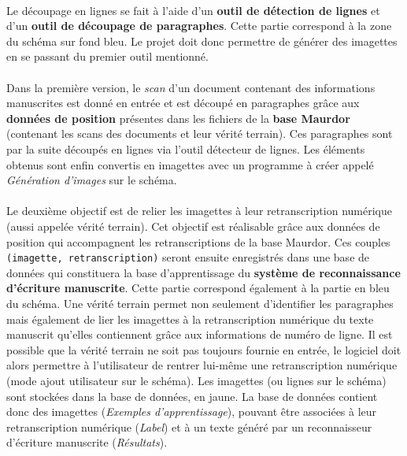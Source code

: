 \paragraph{}
Le découpage en lignes se fait à l’aide d’un \textbf{outil de détection de lignes} et d’un
\textbf{outil de découpage de paragraphes}. Cette partie correspond à la zone du schéma sur fond bleu.
Le projet doit donc permettre de générer des imagettes en se passant du premier outil mentionné.

\paragraph{}
Dans la première version, le \textit{scan} d’un document contenant des informations manuscrites est
donné en entrée et est découpé en paragraphes grâce aux \textbf{données de position} présentes dans
les fichiers de la \textbf{base Maurdor} (contenant les scans des documents et leur vérité terrain).
Ces paragraphes sont par la suite découpés en lignes via l’outil détecteur de lignes. Les éléments obtenus
sont enfin convertis en imagettes avec un programme à créer appelé \textit{Génération d’images} sur le schéma.

\paragraph{}
Le deuxième objectif est de relier les imagettes à leur retranscription numérique
(aussi appelée vérité terrain). Cet objectif est réalisable grâce aux données de position
qui accompagnent les retranscriptions de la base Maurdor. Ces couples \texttt{(imagette, retranscription)}
seront ensuite enregistrés dans une base de données qui constituera la base d’apprentissage du
\textbf{système de reconnaissance d’écriture manuscrite}. Cette partie correspond également à la partie
en bleu du schéma. Une vérité terrain permet non seulement d’identifier les paragraphes mais
également de lier les imagettes à la retranscription numérique du texte manuscrit qu’elles contiennent
grâce aux informations de numéro de ligne. Il est possible que la vérité terrain ne soit pas toujours
fournie en entrée, le logiciel doit alors permettre à l’utilisateur de rentrer lui-même une retranscription
numérique (mode ajout utilisateur sur le schéma). Les imagettes (ou lignes sur le schéma) sont stockées
dans la base de données, en jaune. La base de données contient donc des imagettes (\textit{Exemples d’apprentissage}),
pouvant être associées à leur retranscription numérique (\textit{Label}) et à un texte généré par un
reconnaisseur d’écriture manuscrite (\textit{Résultats}).

